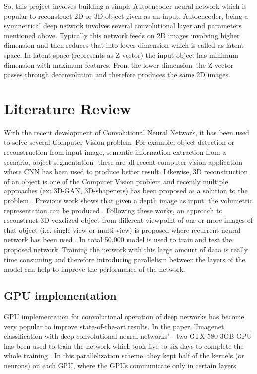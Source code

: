 \documentclass[11pt]{article}       %
\begin{document}
So, this project involves building a simple Autoencoder neural network which is popular to reconstruct 2D or 3D object given as an input. Autoencoder, being a symmetrical deep network involves several convolutional layer and parameters mentioned above. Typically this network feeds on 2D images involving higher dimension and then reduces that into lower dimension \cite{dr8} which is called as latent space. In latent space (represents as Z vector) the input object has minimum dimension with maximum features. From the lower dimension, the Z vector passes through deconvolution and therefore produces the same 2D images.   

\section{Literature Review} \label{litrev}

With the recent development of Convolutional Neural Network, it has been used to solve several Computer Vision problem. For example, object detection or reconstruction from input image, semantic information extraction from a scenario, object segmentation- these are all recent computer vision application where CNN has been used to produce better result. Likewise, 3D reconstruction of an object is one of the Computer Vision problem and recently multiple approaches (ex: 3D-GAN, 3D-shapenets) has been proposed as a solution to the problem \cite{dr1}. Previous work shows that given a depth image as input, the volumetric representation can be produced \cite{dr2}. Following these works, an approach to reconstruct 3D voxelized object from different viewpoint of one or more images of that object (i.e. single-view or multi-view) is proposed where recurrent neural network has been used \cite{dr7}. In total 50,000 model is used to train and test the proposed network. Training the network with this large amount of data is really time consuming and therefore introducing parallelism between the layers of the model can help to improve the performance of the network.

\subsection{GPU implementation} \label{GPUimpl}
GPU implementation for convolutional operation of deep networks has become very popular to improve state-of-the-art results. In the paper, 'Imagenet classification with deep convolutional neural networks' - two GTX 580 3GB GPU has been used to train the network which took five to six days to complete the whole training \cite{dr5}. In this parallelization scheme, they kept half of the kernels (or neurons) on each GPU, where the GPUs communicate only in certain layers.
\end{document}
